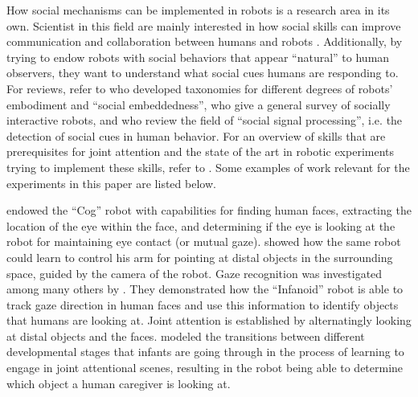 How social mechanisms can be implemented in robots is a research area
in its own. Scientist in this field are mainly interested in how
social skills can improve communication and collaboration between
humans and robots \citep{breazeal02designing}. Additionally, by trying
to endow robots with social behaviors that appear ``natural'' to human
observers, they want to understand what social cues humans are
responding to. For reviews, refer to \cite*{dautenhahn02from} who
developed taxonomies for different degrees of robots' embodiment and
``social embeddedness'', \cite*{fong03survey} who give a general
survey of socially interactive robots, and \cite{vinciarelli09social}
who review the field of ``social signal processing'', i.e. the
detection of social cues in human behavior.  For an overview of skills
that are prerequisites for joint attention and the state of the art in
robotic experiments trying to implement these skills, refer to
\cite{kaplan06challenges}. Some examples of work relevant for the
experiments in this paper are listed below.

\cite{scassellati99imitation} endowed the ``Cog'' robot
\citep{brooks99cog} with capabilities for finding human faces,
extracting the location of the eye within the face, and determining if
the eye is looking at the robot for maintaining eye contact (or mutual
gaze). \cite*{marjanovic99self-taught} showed how the same robot could
learn to control his arm for pointing at distal objects in the
surrounding space, guided by the camera of the robot.  Gaze
recognition was investigated among many others by
\cite{kozima01robot}. They demonstrated how the ``Infanoid'' robot is
able to track gaze direction in human faces and use this information
to identify objects that humans are looking at. Joint attention is
established by alternatingly looking at distal objects and the
faces. \cite{nagai03constructive} modeled the transitions between
different developmental stages that infants are going through in the
process of learning to engage in joint attentional scenes, resulting
in the robot being able to determine which object a human caregiver is
looking at.


